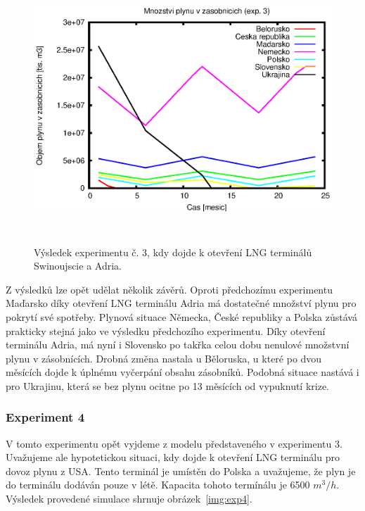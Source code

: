 \documentclass[a4paper,12pt]{article}
\begin{document}
  \begin{figure}[!ht]
    \centering
    \includegraphics[height=10cm]{img/2O.eps}
    \caption{Výsledek experimentu č. 3, kdy dojde k otevření LNG terminálů Swinoujscie a Adria.}
    \label{img:exp3}
  \end{figure}
  
  Z výsledků lze opět udělat několik závěrů. Oproti předchozímu experimentu Maďarsko díky 
  otevření LNG terminálu Adria má dostatečné množství plynu pro pokrytí své spotřeby. Plynová 
  situace Německa, České republiky a Polska zůstává prakticky stejná jako ve výsledku předchozího experimentu.
  Díky otevření terminálu Adria, má nyní i Slovensko po takřka celou dobu nenulové množstvní plynu v zásobnících.
  Drobná změna nastala u Běloruska, u které po dvou měsících dojde k úplnému vyčerpání obsahu zásobníků.
  Podobná situace nastává i pro Ukrajinu, která se bez plynu ocitne po 13 měsících od vypuknutí krize.
 
  \subsubsection{Experiment 4}
  V tomto experimentu opět vyjdeme z modelu představeného v experimentu 3. Uvažujeme ale hypotetickou situaci, kdy
  dojde k otevření LNG terminálu pro dovoz plynu z USA. Tento terminál je umístěn do Polska a uvažujeme, že 
  plyn je do terminálu dodáván pouze v létě. Kapacita tohoto termínálu je 6500 $m^3/h$. Výsledek provedené simulace 
  shrnuje obrázek~\ref{img:exp4}.
  
\end{document}

